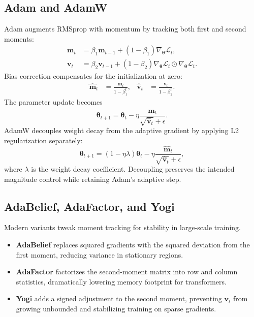 \documentclass{article}
\begin{document}
\subsection{Adam and AdamW}
Adam augments RMSprop with momentum by tracking both first and second moments:
\begin{align}
  \mathbf{m}_t &= \beta_1 \mathbf{m}_{t-1} + (1-\beta_1) \nabla_{\boldsymbol{\theta}} \mathcal{L}_t, \\
  \mathbf{v}_t &= \beta_2 \mathbf{v}_{t-1} + (1-\beta_2) \nabla_{\boldsymbol{\theta}} \mathcal{L}_t \odot \nabla_{\boldsymbol{\theta}} \mathcal{L}_t.
\end{align}
Bias correction compensates for the initialization at zero:
\begin{align}
  \hat{\mathbf{m}}_t &= \frac{\mathbf{m}_t}{1-\beta_1^{t}}, &
  \hat{\mathbf{v}}_t &= \frac{\mathbf{v}_t}{1-\beta_2^{t}}.
\end{align}
The parameter update becomes
\begin{equation}
  \boldsymbol{\theta}_{t+1} = \boldsymbol{\theta}_t - \eta \frac{\hat{\mathbf{m}}_t}{\sqrt{\hat{\mathbf{v}}_t} + \epsilon}.
\end{equation}
AdamW decouples weight decay from the adaptive gradient by applying L2 regularization separately:
\begin{equation}
  \boldsymbol{\theta}_{t+1} = (1-\eta \lambda)\boldsymbol{\theta}_t - \eta \frac{\hat{\mathbf{m}}_t}{\sqrt{\hat{\mathbf{v}}_t} + \epsilon},
\end{equation}
where $\lambda$ is the weight decay coefficient. Decoupling preserves the intended magnitude control while retaining Adam's adaptive step.

\subsection{AdaBelief, AdaFactor, and Yogi}
Modern variants tweak moment tracking for stability in large-scale training.
\begin{itemize}
  \item \textbf{AdaBelief} replaces squared gradients with the squared deviation from the first moment, reducing variance in stationary regions.
  \item \textbf{AdaFactor} factorizes the second-moment matrix into row and column statistics, dramatically lowering memory footprint for transformers.
  \item \textbf{Yogi} adds a signed adjustment to the second moment, preventing $\mathbf{v}_t$ from growing unbounded and stabilizing training on sparse gradients.
\end{itemize}
\end{document}
